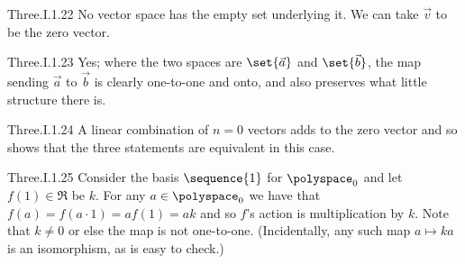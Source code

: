 \begin{ans}{Three.I.1.22}
       No vector space has the empty set underlying it.
       We can take $\vec{v}$ to be the zero vector.
     
\end{ans}
\begin{ans}{Three.I.1.23}
        Yes; where the two spaces are \( \set{\vec{a}} \) and
        \( \set{\vec{b}} \),
        the map sending \( \vec{a} \) to \( \vec{b} \) is clearly one-to-one
        and onto, and also preserves what little structure there is.
      
\end{ans}
\begin{ans}{Three.I.1.24}
       A linear combination of $n=0$ vectors adds to the zero vector and so
       shows that the three statements are equivalent in this case.
    
\end{ans}
\begin{ans}{Three.I.1.25}
      Consider the basis \( \sequence{1} \) for \( \polyspace_0 \)
      and let \( f(1)\in\Re \) be \( k \).
      For any \( a\in\polyspace_0 \)
      we have that
      \( f(a)=f(a\cdot 1)=af(1)=ak \) and so \( f \)'s action is multiplication
      by \( k \).
      Note that \( k\neq 0 \) or else the map is not one-to-one.
      (Incidentally, any such map $a\mapsto ka$ is an isomorphism,
      as is easy to check.)
     
\end{ans}
